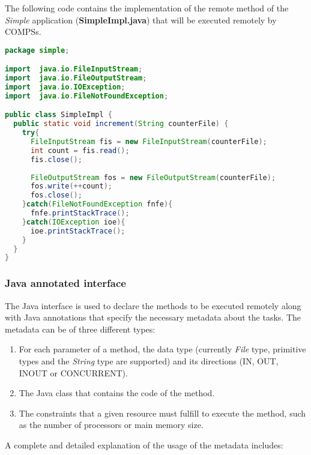 The following code contains the implementation of the remote method of the {\it Simple} application ({\bf SimpleImpl.java})
that will be executed remotely by COMPSs.

\begin{lstlisting}[language=java]
package simple;

import  java.io.FileInputStream;
import  java.io.FileOutputStream;
import  java.io.IOException;
import  java.io.FileNotFoundException;

public class SimpleImpl {
  public static void increment(String counterFile) {
    try{
      FileInputStream fis = new FileInputStream(counterFile);
      int count = fis.read();
      fis.close();
      
      FileOutputStream fos = new FileOutputStream(counterFile);
      fos.write(++count);
      fos.close();
    }catch(FileNotFoundException fnfe){
      fnfe.printStackTrace();
    }catch(IOException ioe){
      ioe.printStackTrace();
    }
  }
}
\end{lstlisting}


\subsubsection{Java annotated interface}
The Java interface is used to declare the methods to be executed remotely along with Java annotations that
specify the necessary metadata about the tasks. The metadata can be of three different types:

\begin{enumerate}
 \item For each parameter of a method, the data type (currently {\it File} type, primitive types and the {\it String} type are supported) and its directions (IN, OUT, INOUT or CONCURRENT).
 \item The Java class that contains the code of the method.
 \item The constraints that a given resource must fulfill to execute the method, such as the number of processors or main memory size.
\end{enumerate}

A complete and detailed explanation of the usage of the metadata includes:

